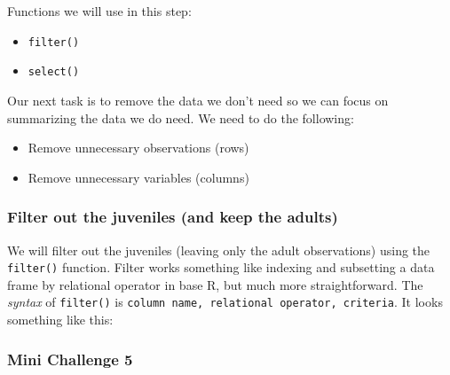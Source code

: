 \documentclass[
]{article}
\newenvironment{Shaded}{\begin{snugshade}}{\end{snugshade}}
\newcommand{\CommentTok}[1]{\textcolor[rgb]{0.56,0.35,0.01}{\textit{#1}}}
\newcommand{\FunctionTok}[1]{\textcolor[rgb]{0.13,0.29,0.53}{\textbf{#1}}}
\newcommand{\NormalTok}[1]{#1}
\newcommand{\SpecialCharTok}[1]{\textcolor[rgb]{0.81,0.36,0.00}{\textbf{#1}}}
\newcommand{\StringTok}[1]{\textcolor[rgb]{0.31,0.60,0.02}{#1}}
\providecommand{\tightlist}{%
  \setlength{\itemsep}{0pt}\setlength{\parskip}{0pt}}
\begin{document}
Functions we will use in this step:

\begin{itemize}
\tightlist
\item
  \texttt{filter()}
\item
  \texttt{select()}
\end{itemize}

Our next task is to remove the data we don't need so we can focus on
summarizing the data we do need. We need to do the following:

\begin{itemize}
\tightlist
\item
  Remove unnecessary observations (rows)
\item
  Remove unnecessary variables (columns)
\end{itemize}

\subsubsection{Filter out the juveniles (and keep the
adults)}\label{filter-out-the-juveniles-and-keep-the-adults}

We will filter out the juveniles (leaving only the adult observations)
using the \texttt{filter()} function. Filter works something like
indexing and subsetting a data frame by relational operator in base R,
but much more straightforward. The \emph{syntax} of \texttt{filter()} is
\texttt{column\ name,\ relational\ operator,\ criteria}. It looks
something like this:

\begin{Shaded}
\end{Shaded}

\subsubsection{\texorpdfstring{\textbf{Mini Challenge
5}}{Mini Challenge 5}}\label{mini-challenge-5}
\end{document}
